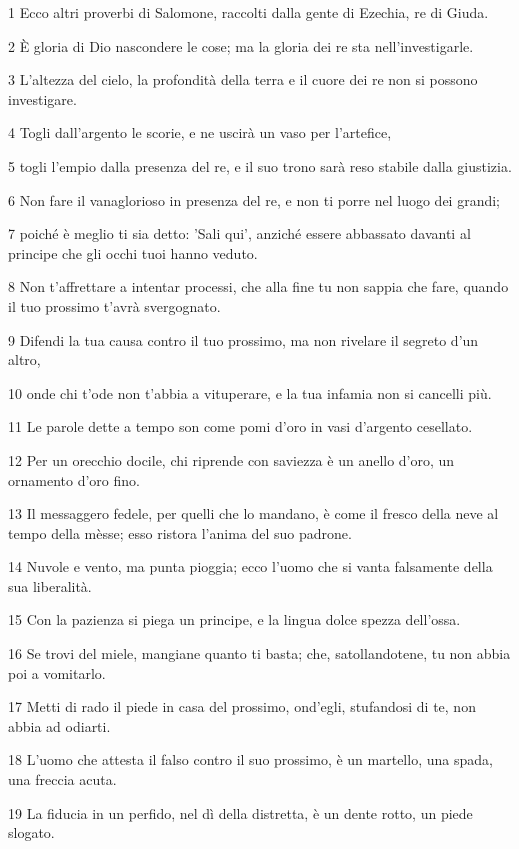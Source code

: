 \par 1 Ecco altri proverbi di Salomone, raccolti dalla gente di Ezechia, re di Giuda.
\par 2 È gloria di Dio nascondere le cose; ma la gloria dei re sta nell'investigarle.
\par 3 L'altezza del cielo, la profondità della terra e il cuore dei re non si possono investigare.
\par 4 Togli dall'argento le scorie, e ne uscirà un vaso per l'artefice,
\par 5 togli l'empio dalla presenza del re, e il suo trono sarà reso stabile dalla giustizia.
\par 6 Non fare il vanaglorioso in presenza del re, e non ti porre nel luogo dei grandi;
\par 7 poiché è meglio ti sia detto: 'Sali qui', anziché essere abbassato davanti al principe che gli occhi tuoi hanno veduto.
\par 8 Non t'affrettare a intentar processi, che alla fine tu non sappia che fare, quando il tuo prossimo t'avrà svergognato.
\par 9 Difendi la tua causa contro il tuo prossimo, ma non rivelare il segreto d'un altro,
\par 10 onde chi t'ode non t'abbia a vituperare, e la tua infamia non si cancelli più.
\par 11 Le parole dette a tempo son come pomi d'oro in vasi d'argento cesellato.
\par 12 Per un orecchio docile, chi riprende con saviezza è un anello d'oro, un ornamento d'oro fino.
\par 13 Il messaggero fedele, per quelli che lo mandano, è come il fresco della neve al tempo della mèsse; esso ristora l'anima del suo padrone.
\par 14 Nuvole e vento, ma punta pioggia; ecco l'uomo che si vanta falsamente della sua liberalità.
\par 15 Con la pazienza si piega un principe, e la lingua dolce spezza dell'ossa.
\par 16 Se trovi del miele, mangiane quanto ti basta; che, satollandotene, tu non abbia poi a vomitarlo.
\par 17 Metti di rado il piede in casa del prossimo, ond'egli, stufandosi di te, non abbia ad odiarti.
\par 18 L'uomo che attesta il falso contro il suo prossimo, è un martello, una spada, una freccia acuta.
\par 19 La fiducia in un perfido, nel dì della distretta, è un dente rotto, un piede slogato.
